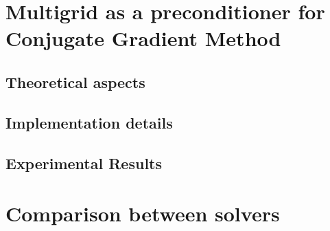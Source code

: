 \section{Multigrid as a preconditioner for Conjugate Gradient Method}
	\subsection{Theoretical aspects}
	\subsection{Implementation details}
	\subsection{Experimental Results}

\section{Comparison between solvers}